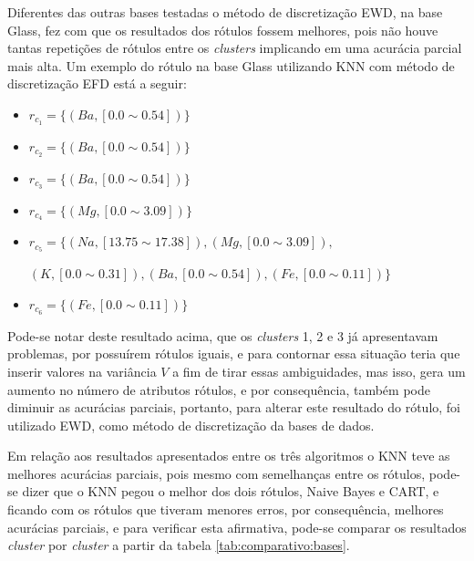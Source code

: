 Diferentes das outras bases testadas o método de discretização EWD, na base Glass, fez com que os resultados dos rótulos fossem melhores, pois não houve tantas repetições de rótulos entre os \textit{clusters} implicando em uma acurácia parcial mais alta. Um exemplo do rótulo na base Glass utilizando KNN com método de discretização EFD está a seguir:
\begin{itemize}[noitemsep]
 \item ${r_{c_1}=\{ (Ba,[ 0.0 \sim 0.54 ] )\} }$
 \item ${r_{c_2}=\{(Ba,[ 0.0 \sim 0.54 ] ) \} }$
 \item ${r_{c_3}=\{ (Ba,[ 0.0 \sim 0.54 ])  \} }$  
 \item ${r_{c_4}=\{ (Mg,[ 0.0 \sim 3.09 ] ) \}}$
 \item ${r_{c_5}=\{ (Na,[13.75 \sim  17.38 ] ), (Mg,[ 0.0 \sim 3.09 ] ), }$
 
 ${(K,[ 0.0 \sim 0.31 ] ), (Ba,[ 0.0 \sim 0.54 ] ), (Fe,[ 0.0 \sim 0.11] ) \} }$
 \item ${r_{c_6}=\{ (Fe,[ 0.0 \sim 0.11] ) \} }$
\end{itemize}

Pode-se notar deste resultado acima, que os \textit{clusters} 1, 2 e 3 já apresentavam problemas, por possuírem rótulos iguais, e para contornar essa situação teria que inserir valores na variância ${V}$ a fim de tirar essas ambiguidades, mas isso, gera um aumento no número de atributos rótulos, e por consequência, também pode diminuir as  acurácias parciais, portanto, para alterar este resultado do rótulo, foi utilizado EWD, como método de discretização da bases de dados.
 
Em relação aos resultados apresentados entre os três algoritmos o KNN teve as melhores acurácias parciais, pois mesmo com semelhanças entre os rótulos, pode-se dizer que o KNN pegou o melhor dos dois rótulos, Naive Bayes e CART, e ficando com os rótulos que tiveram menores erros, por consequência, melhores acurácias parciais, e para verificar esta afirmativa, pode-se comparar os resultados \textit{cluster} por \textit{cluster} a partir da tabela \ref{tab:comparativo:bases}.

